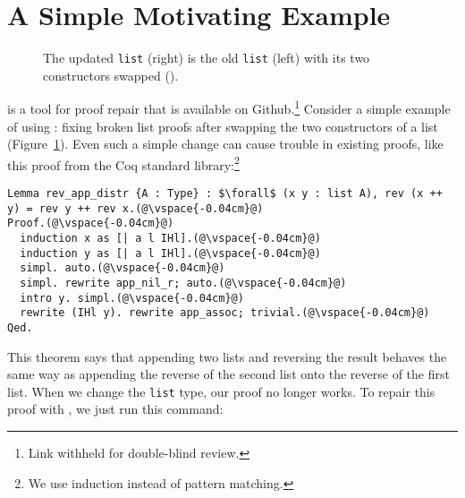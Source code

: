 \section{A Simple Motivating Example}
\label{sec:overview}

\begin{figure}
\begin{minipage}{0.46\textwidth}
   
\end{minipage}
\hfill
\begin{minipage}{0.46\textwidth}
   
\end{minipage}
\vspace{-0.2cm}
\caption{The updated \lstinline{list} (right) is the old \lstinline{list} (left) with its two constructors swapped ().}
\label{fig:listswap}
\end{figure}

\toolname is a tool for proof repair that is available on Github.\footnote{Link withheld for double-blind review.}
Consider a simple example of using \toolname: fixing broken list proofs after swapping the two constructors of a list (Figure~\ref{fig:listswap}).
Even such a simple change can cause trouble in existing proofs, like this proof from the Coq standard library:\footnote{We use induction instead of pattern matching.}

\begin{lstlisting}
Lemma rev_app_distr {A : Type} : $\forall$ (x y : list A), rev (x ++ y) = rev y ++ rev x.(@\vspace{-0.04cm}@)
Proof.(@\vspace{-0.04cm}@)
  induction x as [| a l IHl].(@\vspace{-0.04cm}@)
  induction y as [| a l IHl].(@\vspace{-0.04cm}@)
  simpl. auto.(@\vspace{-0.04cm}@)
  simpl. rewrite app_nil_r; auto.(@\vspace{-0.04cm}@)
  intro y. simpl.(@\vspace{-0.04cm}@)
  rewrite (IHl y). rewrite app_assoc; trivial.(@\vspace{-0.04cm}@)
Qed.
\end{lstlisting}
This theorem says that appending two lists and reversing the result behaves the same way as appending
the reverse of the second list onto the reverse of the first list.
When we change the \lstinline{list} type, our proof no longer works.
To repair this proof with \toolname, we just run this command:

